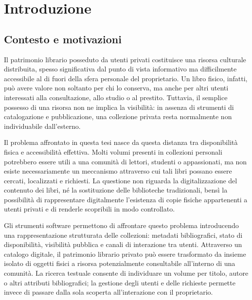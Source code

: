 \chapter{Introduzione}
\label{chap:introduzione}

\section{Contesto e motivazioni}
\label{sec:contesto-motivazioni}

Il patrimonio librario posseduto da utenti privati costituisce una risorsa culturale distribuita, spesso significativa dal punto di vista informativo ma difficilmente accessibile al di fuori della sfera personale del proprietario. Un libro fisico, infatti, può avere valore non soltanto per chi lo conserva, ma anche per altri utenti interessati alla consultazione, allo studio o al prestito. Tuttavia, il semplice possesso di una risorsa non ne implica la visibilità: in assenza di strumenti di catalogazione e pubblicazione, una collezione privata resta normalmente non individuabile dall'esterno.

Il problema affrontato in questa tesi nasce da questa distanza tra disponibilità fisica e accessibilità effettiva. Molti volumi presenti in collezioni personali potrebbero essere utili a una comunità di lettori, studenti o appassionati, ma non esiste necessariamente un meccanismo attraverso cui tali libri possano essere cercati, localizzati e richiesti. La questione non riguarda la digitalizzazione del contenuto dei libri, né la sostituzione delle biblioteche tradizionali, bensì la possibilità di rappresentare digitalmente l'esistenza di copie fisiche appartenenti a utenti privati e di renderle scopribili in modo controllato.

Gli strumenti software permettono di affrontare questo problema introducendo una rappresentazione strutturata delle collezioni: metadati bibliografici, stato di disponibilità, visibilità pubblica e canali di interazione tra utenti. Attraverso un catalogo digitale, il patrimonio librario privato può essere trasformato da insieme isolato di oggetti fisici a risorsa potenzialmente consultabile all'interno di una comunità. La ricerca testuale consente di individuare un volume per titolo, autore o altri attributi bibliografici; la gestione degli utenti e delle richieste permette invece di passare dalla sola scoperta all'interazione con il proprietario.

